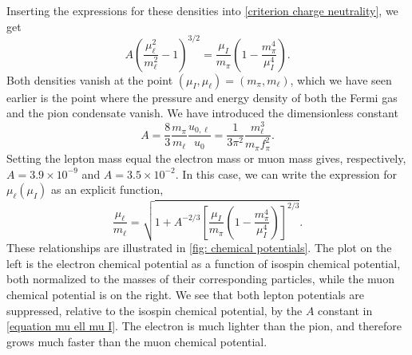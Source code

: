 Inserting the expressions for these densities into \autoref{criterion charge neutrality}, we get
%
\begin{equation}
    \label{equation mu ell mu I}
    A \left(\frac{\mu_\ell^2 }{m_\ell^2} - 1 \right)^{3/2}
    = \frac{\mu_I}{m_\pi}\left( 1 - \frac{m_\pi^4}{\mu_I^4}  \right).
\end{equation}
%
Both densities vanish at the point $(\mu_I, \mu_\ell) = (m_\pi, m_\ell)$, which we have seen earlier is the point where the pressure and energy density of both the Fermi gas and the pion condensate vanish.
We have introduced the dimensionless constant
%
\begin{equation}
    A = \frac{8}{3} \frac{m_\pi} {m_\ell} \frac{u_{0, \ell}}{u_0}
    = \frac{1}{3 \pi^2} \frac{m_\ell^3}{m_\pi f_\pi^2}.
\end{equation}
%
Setting the lepton mass equal the electron mass or muon mass gives, respectively, $A = 3.9 \times10^{- 9}$ and $A = 3.5 \times 10^{-2}$.
In this case, we can write the expression for $\mu_\ell(\mu_I)$ as an explicit function,
%
\begin{equation}
    \label{mu ell from mu I}
    \frac{\mu_\ell}{m_\ell}
    =
    \sqrt{
        1 + A^{-2/3}
        \left[
            \frac{\mu_I}{m_\pi}\left( 1 - \frac{m_\pi^4}{\mu_I^4}  \right)
        \right]^{2/3}
    }.
\end{equation}
%
These relationships are illustrated in \autoref{fig: chemical potentials}.
The plot on the left is the electron chemical potential as a function of isospin chemical potential, both normalized to the masses of their corresponding particles, while the muon chemical potential is on the right.
We see that both lepton potentials are suppressed, relative to the isospin chemical potential, by the $A$ constant in \autoref{equation mu ell mu I}.
The electron is much lighter than the pion, and therefore grows much faster than the muon chemical potential.

